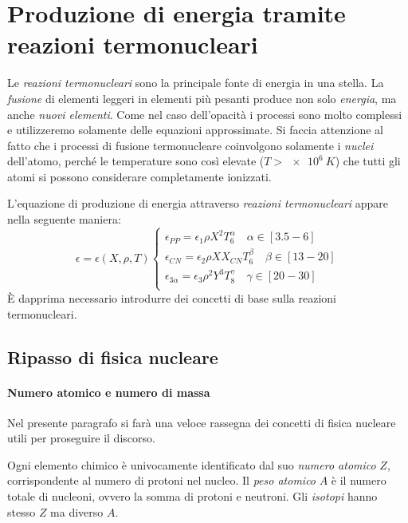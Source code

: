 \section[Reazioni Termonucleari]{Produzione di energia tramite reazioni termonucleari}\label{sec:reazioni-termonucleari}
Le \emph{reazioni termonucleari} sono la principale fonte di energia in una stella. La \emph{fusione} di elementi leggeri in elementi più pesanti produce non solo \emph{energia}, ma anche \emph{nuovi elementi}. Come nel caso dell'opacità i processi sono molto complessi e utilizzeremo solamente delle equazioni approssimate. Si faccia attenzione al fatto che i processi di fusione termonucleare coinvolgono solamente i \emph{nuclei} dell'atomo, perché le temperature sono così elevate ($T > \SI{e6}{K}$) che tutti gli atomi si possono considerare completamente ionizzati.

L'equazione di produzione di energia attraverso \emph{reazioni termonucleari} appare nella seguente maniera:
\begin{equation}\label{eq:reazioni-termonucleari}
    \epsilon = \epsilon(X, \rho, T) 
    \begin{cases} \epsilon_{PP} = \epsilon_1 \rho X^2 T_6^\alpha \quad \alpha \in [3.5 - 6] \\ 
    \epsilon_{CN} = \epsilon_2 \rho X X_{CN} T_6^\beta \quad \beta \in [13 - 20] \\ 
    \epsilon_{3\alpha} = \epsilon_3 \rho^2 Y^3 T_8^\gamma \quad \gamma \in [20 - 30] \\
    \end{cases}
\end{equation}
È dapprima necessario introdurre dei concetti di base sulla reazioni termonucleari.

\subsection{Ripasso di fisica nucleare}
\paragraph{Numero atomico e numero di massa}
Nel presente paragrafo si farà una veloce rassegna dei concetti di fisica nucleare utili per proseguire il discorso.

Ogni elemento chimico è univocamente identificato dal suo \emph{numero atomico} $Z$, corrispondente al numero di protoni nel nucleo. Il \emph{peso atomico} $A$ è il numero totale di nucleoni, ovvero la somma di protoni e neutroni. Gli \emph{isotopi} hanno stesso $Z$ ma diverso $A$.

